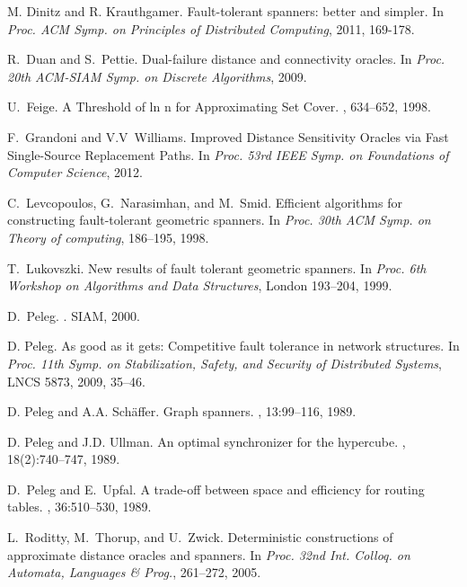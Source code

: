 \documentclass[12pt]{article}
\begin{document}
\begin{thebibliography}{10}
M. Dinitz and R. Krauthgamer.
\newblock Fault-tolerant spanners: better and simpler.
\newblock
In {\em Proc. ACM Symp. on Principles of Distributed Computing},
2011, 169-178.


R.~Duan and S.~Pettie.
\newblock Dual-failure distance and connectivity oracles.
\newblock
In {\em Proc. 20th ACM-SIAM Symp. on Discrete Algorithms},
2009.







U.~Feige.
\newblock A Threshold of ln n for Approximating Set Cover.
, 634--652, 1998.

F.~Grandoni and V.V~Williams.
\newblock Improved Distance Sensitivity Oracles via Fast Single-Source Replacement Paths.
\newblock
In {\em Proc. 53rd IEEE Symp. on Foundations of Computer Science},
2012.

C.~Levcopoulos, G.~Narasimhan, and M.~Smid.
\newblock Efficient algorithms for constructing fault-tolerant geometric
  spanners.
\newblock
In {\em Proc. 30th ACM Symp. on Theory of computing},
186--195, 1998.

T.~Lukovszki.
\newblock New results of fault tolerant geometric spanners.
\newblock
In {\em Proc. 6th Workshop on Algorithms and Data Structures}, London
193--204, 1999.



D.~Peleg.
.
\newblock SIAM, 2000.


D. Peleg.
\newblock As good as it gets: Competitive fault tolerance in network structures.
\newblock
In {\em Proc. 11th Symp. on Stabilization, Safety, and Security
of Distributed Systems}, LNCS 5873,
2009, 35--46.



D. Peleg and A.A. Sch\"affer.
\newblock Graph spanners.
, 13:99--116, 1989.

D. Peleg and J.D. Ullman.
\newblock An optimal synchronizer for the hypercube.
, 18(2):740--747, 1989.


D.~Peleg and E.~Upfal.
\newblock A trade-off between space and efficiency for routing tables.
, 36:510--530, 1989.

L.~Roditty, M.~Thorup, and U.~Zwick.
\newblock Deterministic constructions of approximate distance oracles and
  spanners.
\newblock
In {\em Proc. 32nd Int. Colloq. on Automata, Languages \& Prog.},
261--272, 2005.



\end{thebibliography}
\end{document}
